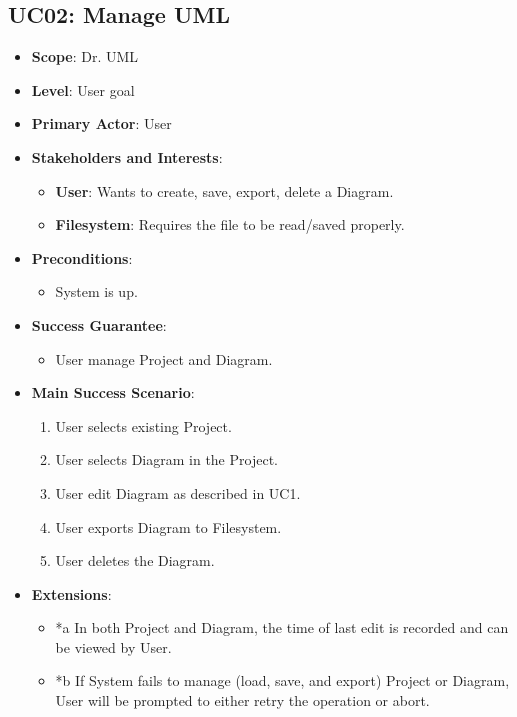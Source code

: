 \documentclass[12pt]{article}
\begin{document}
    \subsection{UC02: Manage UML}
    \begin{itemize}
        \item \textbf{Scope}: Dr. UML
        \item \textbf{Level}: User goal
        \item \textbf{Primary Actor}: User
        \item \textbf{Stakeholders and Interests}:
        \begin{itemize}
            \item \textbf{User}: Wants to create, save, export, delete a Diagram.
            \item \textbf{Filesystem}: Requires the file to be read/saved properly.
        \end{itemize}
        \item \textbf{Preconditions}:
        \begin{itemize}
            \item System is up.
        \end{itemize}
        \item \textbf{Success Guarantee}:
        \begin{itemize}
            \item User manage Project and Diagram.
        \end{itemize}
        \item \textbf{Main Success Scenario}:
        \begin{enumerate}
            \item User selects existing Project.
            \item User selects Diagram in the Project.
            \item User edit Diagram as described in UC1.
            \item User exports Diagram to Filesystem.
            \item User deletes the Diagram.
        \end{enumerate}
        \item \textbf{Extensions}:
        \begin{itemize}
            \item *a In both Project and Diagram, the time of last edit is recorded and can be viewed by User.
            \item *b If System fails to manage (load, save, and export) Project or Diagram, User will be prompted to either retry the operation or abort.

\end{itemize}
\end{itemize}
\end{document}
